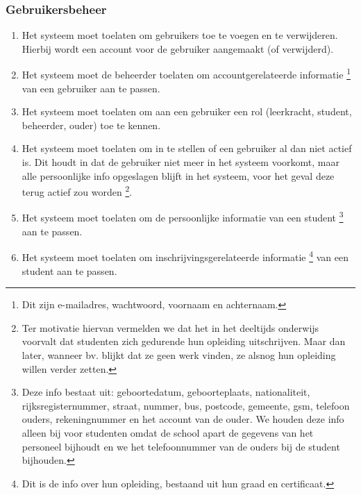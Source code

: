 \documentclass[a4paper]{article}
\begin{document}
\subsubsection{Gebruikersbeheer}
\begin{enumerate}[label=F\arabic*]
\item Het systeem moet toelaten om gebruikers toe te voegen en te verwijderen. Hierbij wordt een account voor de gebruiker aangemaakt (of verwijderd).
\item \label{itm:account_info} Het systeem moet de beheerder toelaten om accountgerelateerde informatie \footnote{Dit zijn e-mailadres, wachtwoord, voornaam en achternaam.} van een gebruiker aan te passen.
\item Het systeem moet toelaten om aan een gebruiker een rol (leerkracht, student, beheerder, ouder) toe te kennen.
\item Het systeem moet toelaten om in te stellen of een gebruiker al dan niet actief is. Dit houdt in dat de gebruiker niet meer in het systeem voorkomt, maar alle persoonlijke info opgeslagen blijft in het systeem, voor het geval deze terug actief zou worden \footnote{Ter motivatie hiervan vermelden we dat het in het deeltijds onderwijs voorvalt dat studenten zich gedurende hun opleiding uitschrijven. Maar dan later, wanneer bv. blijkt dat ze geen werk vinden, ze alsnog hun opleiding willen verder zetten.}.
\item \label{itm:pers_info} Het systeem moet toelaten om de persoonlijke informatie van een student \footnote{Deze info bestaat uit: geboortedatum, geboorteplaats, nationaliteit, rijksregisternummer, straat, nummer, bus, postcode, gemeente, gsm, telefoon ouders, rekeningnummer en het account van de ouder. We houden deze info alleen bij voor studenten omdat de school apart de gegevens van het personeel bijhoudt en we het telefoonnummer van de ouders bij de student bijhouden.} aan te passen.
\item \label{itm:inschr_info} Het systeem moet toelaten om inschrijvingsgerelateerde informatie \footnote{Dit is de info over hun opleiding, bestaand uit hun graad en certificaat.} van een student aan te passen.
\end{enumerate}
\end{document}
